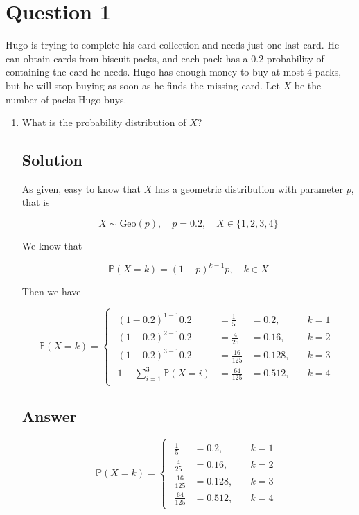 \documentclass[12pt]{article}
\newcommand{\bP}{\mathbb{P}}
\begin{document}
	
	\section*{Question 1}
	
	\noindent Hugo is trying to complete his card collection and needs just one last card. He can obtain cards from biscuit packs, and each pack has a $0.2$ probability of containing the card he needs. Hugo has enough money to buy at most $4$ packs, but he will stop buying as soon as he finds the missing card. Let $X$ be the number of packs Hugo buys.
	
	\bigskip
	
	\begin{enumerate}[start=1,label={\bfseries Part \arabic*:},leftmargin=0in]
		\bigskip\item What is the probability distribution of $X$?
		
		\subsection*{Solution}
		
			As given, easy to know that $X$ has a geometric distribution with parameter $p$, that is
			
			\[X\sim\text{Geo}(p),\quad p = 0.2,\quad X \in \{1,2,3,4\}\]
			
			We know that
			
			\[\bP(X = k) = (1-p)^{k-1}p,\quad k\in X\]
			
			Then we have
			
			\[
				\bP(X = k) =
					\begin{cases}
						\begin{aligned}
							(1-0.2)^{1-1} 0.2 &= \frac{1}{5} &= 0.2, &\quad k = 1\\
							(1-0.2)^{2-1} 0.2 &= \frac{4}{25} &= 0.16, &\quad k = 2\\
							(1-0.2)^{3-1} 0.2 &= \frac{16}{125} &= 0.128, &\quad k = 3\\
							1 - \sum_{i=1}^3\bP(X = i) &= \frac{64}{125} &= 0.512, &\quad k = 4
						\end{aligned}
					\end{cases}
			\]
		
		\subsection*{Answer}
		
			\[\boxed{\bP(X = k) =
				\begin{cases}
					\begin{aligned}
						\frac{1}{5} &= 0.2, &\quad k = 1\\
						\frac{4}{25} &= 0.16, &\quad k = 2\\
						\frac{16}{125} &= 0.128, &\quad k = 3\\
						\frac{64}{125} &= 0.512, &\quad k = 4
					\end{aligned}
			\end{cases}}\]
		

\end{enumerate}
\end{document}
